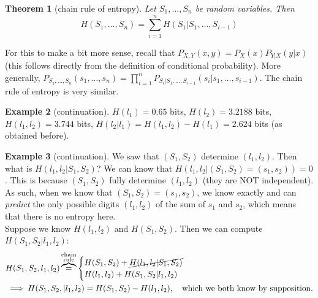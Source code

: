 \documentclass{report}
\theoremstyle{plain}
\newtheorem{thm}{Theorem}
\theoremstyle{definition}
\newtheorem{exmp}[thm]{Example}
\theoremstyle{remark}
\begin{document}
\begin{thm}[chain rule of entropy]
	Let $S_1, \ldots, S_n$ be random variables. Then
	\begin{equation}
		H(S_1, \ldots, S_n) = \sum_{i=1}^n H(S_1 | S_1, \ldots, S_{i-1})
	\end{equation}
\end{thm}

 For this to make a bit more sense, recall that $P_{X, Y}(x, y) = P_X(x)P_{Y|X}(y|x)$ (this follows directly from the definition of conditional probability). More generally, $P_{S_1, \ldots, S_n}(s_1, \ldots, s_n) = \prod_{i=1}^n P_{S_i | S_1, \ldots, S_{i-1}}(s_i | s_1, \ldots, s_{i-1})$. The chain rule of entropy is very similar.
 
 \begin{exmp}[continuation]
 	$H(l_1) = 0.65$ bits, $H(l_2) = 3.2188$ bits, $H(l_1, l_2) = 3.744$ bits, $H(l_2 | l_1) = H(l_1, l_2) - H(l_1) = 2.624$ bits (as obtained before).
 \end{exmp}
 
 \begin{exmp}[continuation]
 	We saw that $(S_1, S_2)$ determine $(l_1, l_2)$. Then what is $H(l_1, l_2 | S_1, S_2)$? We can know that $H(l_1, l_2 | (S_1, S_2) = (s_1, s_2)) = 0$. This is because $(S_1, S_2)$ fully determine $(l_1, l_2)$ (they are NOT independent). As such, when we know that $(S_1, S_2) = (s_1, s_2)$, we know exactly and can \emph{predict} the only possible digits $(l_1, l_2)$ of the sum of $s_1$ and $s_2$, which means that there is no entropy here. \\
 	Suppose we know $H(l_1, l_2)$ and $H(S_1, S_2)$. Then we can compute $H(S_1, S_2 | l_1, l_2)$:
 	\begin{align*}
 		&H(S_1, S_2, l_1, l_2) \overbrace{=}^{\substack{\text{chain} \\ \text{rule}}} \begin{cases} H(S_1, S_2) + \cancel{H(l_1, l_2 | S_1, S_2)} \\
 													  H(l_1, l_2) + H(S_1, S_2 | l_1, l_2)
 													  \end{cases} \\
		&\implies H(S_1, S_2, | l_1, l_2) = H(S_1, S_2) - H(l_1, l_2), \quad \text{which we both know by supposition.}
 	\end{align*}
 \end{exmp}
 
\end{document}
